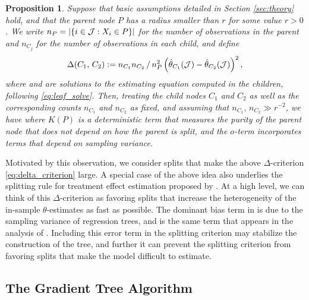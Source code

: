 \documentclass[aos]{imsart}
\theoremstyle{plain}
\newtheorem{prop}{Proposition}
\theoremstyle{definition}
\theoremstyle{remark}
\begin{document}
\begin{CJK}{UTF8}{gbsn}
\begin{prop}
\label{prop:motivation}
Suppose that basic assumptions detailed in Section \ref{sec:theory} hold,
and that the parent node $P$ has a radius smaller than
$r$ for some value $r > 0$. We write $n_P = \left\lvert\left\{i\in\mathcal{J} : X_i \in P\right\}\right\rvert$ for the number of
observations in the parent and $n_{C_j}$ for the number of observations in each child, and define
\begin{equation}
\label{eq:delta_criterion}
\Delta(C_1, \, C_2) := {n_{C_1} n_{C_2}}\,/\,{n_P^2}  \p{\htheta_{C_1}(\mathcal{J}) - \htheta_{C_2}(\mathcal{J})}^2,
\end{equation}
where  and  are solutions to the
estimating equation computed in the children, following \eqref{eq:leaf_solve}.
Then, treating the child nodes $C_1$ and $C_2$ as well as the corresponding counts $n_{C_1}$ and $n_{C_2}$
as fixed, and assuming that $n_{C_1}, \, n_{C_2} \gg r^{-2}$, we have
where $K(P)$ is a deterministic term that measures the purity of the parent node
that does not depend on how the parent is split, and the $o$-term incorporates terms that depend on
sampling variance.
\end{prop}

Motivated by this observation, we consider splits that make the above $\Delta$-criterion
\eqref{eq:delta_criterion} large. A special case of the above idea also underlies
the splitting rule for treatment effect estimation proposed by \citet{athey2016recursive}.
At a high level, we can think of this $\Delta$-criterion as favoring splits that
increase the heterogeneity of the in-sample $\theta$-estimates as fast as possible.
The dominant bias term in  is due to the
sampling variance of regression trees, and is the same term that appears in the analysis
of \citet{athey2016recursive}. Including this error term in the splitting criterion may
stabilize the construction of the tree, and further it can prevent the splitting criterion
from favoring splits that make the model difficult to estimate.

\subsection{The Gradient Tree Algorithm}


\end{CJK}
\end{document}
